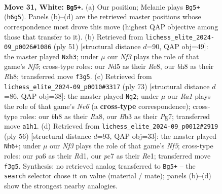 \documentclass[11pt]{article}
\begin{document}
\clearpage

\begin{figure}[p]\centering
\begin{subfigure}{0.46\textwidth}\centering
\resizebox{\linewidth}{!}{%
\newchessgame
\chessboard[
  setfen={r2kr2b/2pb4/pp1n3B/P2N1p2/4p2R/1B3N2/1P2KPP1/R7 w - - 0 31},
  showmover=false,
  pgfstyle=straightmove, color=movearrow, markmove={h6-g5}
]}
\caption{}
\end{subfigure}\hfill
\begin{subfigure}{0.46\textwidth}\centering
\resizebox{\linewidth}{!}{%
\newchessgame
\chessboard[
  setfen={2k1r2r/p1b3p1/1p4b1/P1p2p2/5n2/1NP2BBP/4PP2/2R2K1R b - - 0 26},
  showmover=false,
  pgfstyle=straightmove, color=movearrow, markmove={f4-h3}
]}
\caption{}
\end{subfigure}
\\[4pt]
\begin{subfigure}{0.46\textwidth}\centering
\resizebox{\linewidth}{!}{%
\newchessgame
\chessboard[
  setfen={r3r3/1pk3p1/2n2p2/1R4pP/3N2P1/2P1nP2/PP2B3/K1R5 b - - 6 37},
  showmover=false,
  pgfstyle=straightmove, color=movearrow, markmove={e3-g2}
]}
\caption{}
\end{subfigure}\hfill
\begin{subfigure}{0.46\textwidth}\centering
\resizebox{\linewidth}{!}{%
\newchessgame
\chessboard[
  setfen={1r2r1k1/1p3p2/p1n3p1/2bpPN2/3p1P1B/8/PP4P1/3RR1K1 w - - 0 29},
  showmover=false,
  pgfstyle=straightmove, color=movearrow, markmove={f5-h6}
]}
\caption{}
\end{subfigure}
\caption{\textbf{Move 31, White: \texttt{Bg5+}.} (a) Our position; Melanie plays \texttt{Bg5+} (\texttt{h6g5}). Panels (b)--(d) are the retrieved master positions whose correspondence most drove this move (highest QAP objective among those that transfer to it). (b) Retrieved from \texttt{lichess\_elite\_2024-09\_p0026\#1086} (ply 51) [structural distance $d$=90, QAP obj=49]: the master played \texttt{Nxh3}; under $\mu$ our \emph{Nf3} plays the role of that game's \emph{Nf5}; cross-type roles: our \emph{N}d5 as their \emph{R}e8, our \emph{b}h8 as their \emph{R}h8; transferred move \texttt{f3g5}. (c) Retrieved from \texttt{lichess\_elite\_2024-09\_p0010\#3317} (ply 73) [structural distance $d$=86, QAP obj=38]: the master played \texttt{Ng2}; under $\mu$ our \emph{Ra1} plays the role of that game's \emph{Ne6} (a \textbf{cross-type} correspondence); cross-type roles: our \emph{b}h8 as their \emph{R}a8, our \emph{B}b3 as their \emph{P}g7; transferred move \texttt{a1h1}. (d) Retrieved from \texttt{lichess\_elite\_2024-09\_p0012\#2919} (ply 56) [structural distance $d$=93, QAP obj=33]: the master played \texttt{Nh6+}; under $\mu$ our \emph{Nf3} plays the role of that game's \emph{Nf5}; cross-type roles: our \emph{p}a6 as their \emph{R}d1, our \emph{p}c7 as their \emph{R}e1; transferred move \texttt{f3g5}. Synthesis: no retrieved analog transferred to \texttt{Bg5+} -- the \texttt{search} selector chose it on value (material / mate); panels (b)--(d) show the strongest nearby analogies.}
\label{fig:thought-m60}
\end{figure}
\end{document}
